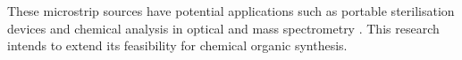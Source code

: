 These microstrip sources have potential applications such as portable sterilisation devices \cite{Pollak2008} and chemical analysis in optical and mass spectrometry \cite{Karanassios2005}. This research intends to extend its feasibility for chemical organic synthesis.


